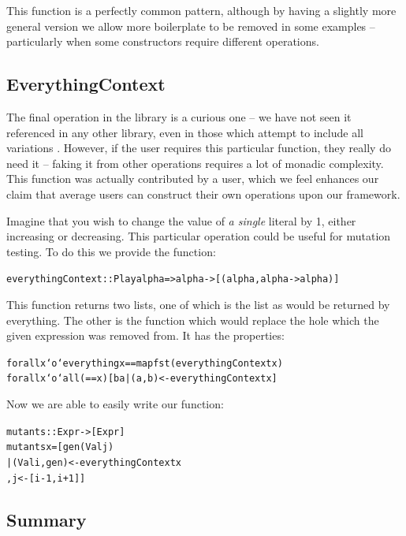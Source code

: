 \documentclass[preprint]{sigplanconf}
\newenvironment{code}{\begin{alltt}\small}{\end{alltt}}
\begin{document}
This function is a perfectly common pattern, although by having a slightly more general version we allow more boilerplate to be removed in some examples -- particularly when some constructors require different operations.


\subsection{EverythingContext}

The final operation in the library is a curious one -- we have not seen it referenced in any other library, even in those which attempt to include all variations \cite{ren:generic_recursion_toolbox}. However, if the user requires this particular function, they really do need it -- faking it from other operations requires a lot of monadic complexity. This function was actually contributed by a user, which we feel enhances our claim that average users can construct their own operations upon our framework.

Imagine that you wish to change the value of \textit{a single} literal by 1, either increasing or decreasing. This particular operation could be useful for mutation testing. To do this we provide the function:

\begin{code}
everythingContext :: Play alpha => alpha -> [(alpha, alpha -> alpha)]
\end{code}

This function returns two lists, one of which is the list as would be returned by everything. The other is the function which would replace the hole which the given expression was removed from. It has the properties:

\begin{code}
forall x `o` everything x == map fst (everythingContext x)
forall x `o` all (== x) [b a | (a,b) <- everythingContext x]
\end{code}

Now we are able to easily write our function:

\begin{code}
mutants :: Expr -> [Expr]
mutants x =  [gen (Val j)
             | (Val i, gen) <- everythingContext x
             , j <- [i-1, i+1]]
\end{code}


\subsection{Summary}
\end{document}

